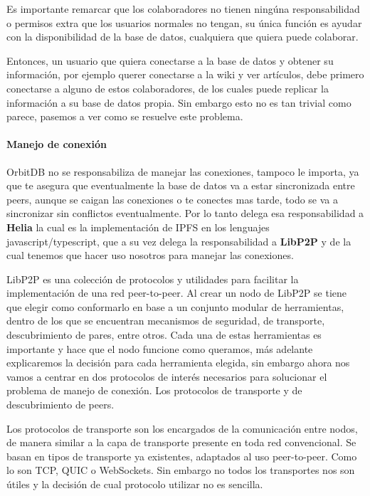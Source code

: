 Es importante remarcar que los colaboradores no tienen ningúna responsabilidad o permisos extra que los usuarios normales no tengan, su única función es ayudar con la disponibilidad de la base de datos, cualquiera que quiera puede colaborar.

Entonces, un usuario que quiera conectarse a la base de datos y obtener su información, por ejemplo querer conectarse a la wiki y ver artículos, debe primero conectarse a alguno de estos colaboradores, de los cuales puede replicar la información a su base de datos propia. Sin embargo esto no es tan trivial como parece, pasemos a ver como se resuelve este problema.

\paragraph{Manejo de conexión}

OrbitDB no se responsabiliza de manejar las conexiones, tampoco le importa, ya que te asegura que eventualmente la base de datos va a estar sincronizada entre peers, aunque se caigan las conexiones o te conectes mas tarde, todo se va a sincronizar sin conflictos eventualmente. Por lo tanto delega esa responsabilidad a \textbf{Helia}\cite{helia} la cual es la implementación de IPFS en los lenguajes javascript/typescript, que a su vez delega la responsabilidad a \textbf{LibP2P}\cite{libp2p} y de la cual tenemos que hacer uso nosotros para manejar las conexiones.

LibP2P es una colección de protocolos y utilidades para facilitar la implementación de una red peer-to-peer. Al crear un nodo de LibP2P se tiene que elegir como conformarlo en base a un conjunto modular de herramientas, dentro de los que se encuentran mecanismos de seguridad, de transporte, descubrimiento de pares, entre otros. Cada una de estas herramientas es importante y hace que el nodo funcione como queramos, más adelante explicaremos la decisión para cada herramienta elegida, sin embargo ahora nos vamos a centrar en dos protocolos de interés necesarios para solucionar el problema de manejo de conexión. Los protocolos de transporte y de descubrimiento de peers.

Los protocolos de transporte son los encargados de la comunicación entre nodos, de manera similar a la capa de transporte presente en toda red convencional. Se basan en tipos de transporte ya existentes, adaptados al uso peer-to-peer. Como lo son TCP, QUIC o WebSockets. Sin embargo no todos los transportes nos son útiles y la decisión de cual protocolo utilizar no es sencilla.

